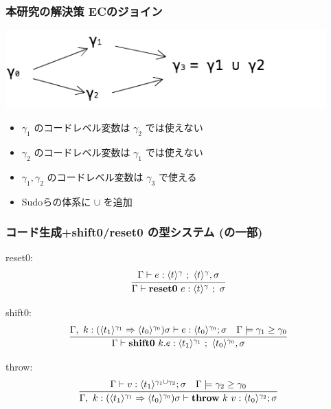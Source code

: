 



\begin{frame}
  \frametitle{本研究の解決策 ECのジョイン}
  \flushleft
  \includegraphics[clip,height=3cm]{./img/ecgraph.png}
  \begin{itemize}
  \item<2-> $\gamma_1$ のコードレベル変数は $\gamma_2$ では使えない
  \item<2-> $\gamma_2$ のコードレベル変数は $\gamma_1$ では使えない
  \item<2-> $\gamma_1, \gamma_2$ のコードレベル変数は $\gamma_3$ で使える
  \item<3->[$\Rightarrow$] Sudoらの体系に $\cup$ を追加
  \end{itemize}
\end{frame}

\begin{frame}[fragile]
  \frametitle{コード生成+shift0/reset0 の型システム\small{ (の一部)}}
  reset0:
  \[
    \infer{\Gamma \vdash \resetz{e} : \codeT{t}{\gamma} ~;~ \sigma}
    {\Gamma \vdash e : \codeT{t}{\gamma} ~;~ \codeT{t}{\gamma}, \sigma}
  \]

  shift0:
  \[
    \infer{\Gamma \vdash \shiftz{k}{e} : \codeT{t_1}{\gamma_1} ~;~ \codeT{t_0}{\gamma_0},\sigma}
    {\Gamma,~k:\contT{\codeT{t_1}{\gamma_1}}{\codeT{t_0}{\gamma_0}}{\sigma}
      \vdash e : \codeT{t_0}{\gamma_0} ; \sigma
      & \Gamma \models \gamma_1 \ord \gamma_0
    }
  \]

  throw:
  \[
    \infer
    {\Gamma,~k:\contT{\codeT{t_1}{\gamma_1}}{\codeT{t_0}{\gamma_0}}{\sigma}
      \vdash \throw{k}{v} : \codeT{t_0}{\gamma_2} ; \sigma}
    {\Gamma
      \vdash v : \codeT{t_1}{\gamma_1 \cup \gamma_2} ; \sigma
      & \Gamma \models \gamma_2 \ord \gamma_0
    }
  \]
\end{frame}


